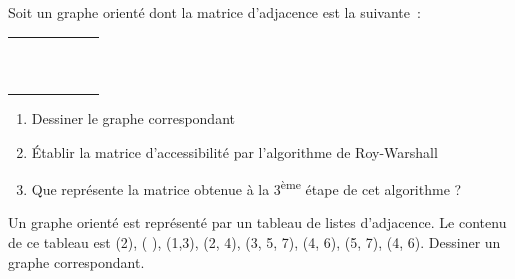 	\begin{Exercice}{}
		Soit un graphe orienté dont la matrice d'adjacence est la suivante~:
				
		\begin{center}
			\tablefirsthead{}
			\tablehead{}
			\tabletail{}
			\tablelasttail{}
			\begin{supertabular}{m{0.93900007cm}|m{0.81600004cm}|m{0.81600004cm}|m{0.81600004cm}|m{0.81600004cm}|m{0.81600004cm}|}
			 &
			 &
			 &
			 &
			 &
			\\\hhline{~-----}
			 &
			 &
			 &
			 &
			 &
			\centering{}\\\hhline{~-----}
			 &
			 &
			 &
			 &
			 &
			\centering{}\\\hhline{~-----}
			 &
			 &
			 &
			 &
			 &
			\centering{}\\\hhline{~-----}
			 &
			 &
			 &
			 &
			 &
			\centering{}\\\hhline{~-----}
			 &
			 &
			 &
			 &
			 &
			\centering{}\\\hhline{~-----}
			\end{supertabular}
		\end{center}
		
		\begin{enumerate}
			\item {
				Dessiner le graphe correspondant}
			\item {
				Établir la matrice d'accessibilité par l'algorithme de Roy-Warshall}
			\item {
				Que représente la matrice obtenue à la 3\textsuperscript{ème} étape de cet algorithme ?}
		\end{enumerate}
		
	\end{Exercice}
	
	\begin{Exercice}{}
		Un graphe orienté est représenté par un tableau de 
		listes d'adjacence. Le contenu de ce tableau est
		(2), ( ), (1,3), (2, 4), (3, 5, 7), (4, 6), (5, 7), (4, 6). 
		Dessiner un graphe correspondant.

	\end{Exercice}
	
